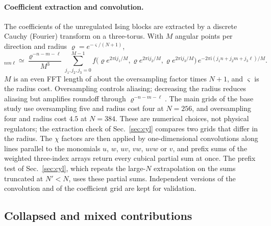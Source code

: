 \documentclass[11pt,a4paper]{article}
\numberwithin{equation}{section}
\begin{document}
\paragraph{Coefficient extraction and convolution.} The coefficients of the unregulated Ising blocks are extracted by
a discrete Cauchy (Fourier) transform on a three-torus. With $M$ angular points per direction and radius
$\varrho=e^{-\varsigma/(N+1)}$,
\begin{equation}
 [f]_{nm\ell}\simeq\frac{\varrho^{-n-m-\ell}}{M^3}\sum_{j_1,j_2,j_3=0}^{M-1}
 f\bigl(\varrho e^{2\pi\mathrm ij_1/M},\varrho e^{2\pi\mathrm ij_2/M},\varrho e^{2\pi\mathrm ij_3/M}\bigr)\,
 e^{-2\pi\mathrm i(j_1n+j_2m+j_3\ell)/M}.
\end{equation}
$M$ is an even FFT length of about the oversampling factor times $N+1$, and $\varsigma$ is the radius cost.
Oversampling controls aliasing; decreasing the radius reduces aliasing but amplifies roundoff through
$\varrho^{-n-m-\ell}$. The main grids of the base study use oversampling five and radius cost four at $N=256$, and
oversampling four and radius cost $4.5$ at $N=384$. These are numerical choices, not physical regulators; the
extraction check of Sec.~\ref{sec:cyl} compares two grids that differ in the radius. The $\chi$ factors are then
applied by one-dimensional convolutions along lines parallel to the monomials $u$, $w$, $uv$, $vw$, $uvw$ or $v$, and
prefix sums of the weighted three-index arrays return every cubical partial sum at once. The prefix test of
Sec.~\ref{sec:cyl}, which repeats the large-$N$ extrapolation on the sums truncated at $N'<N$, uses these partial sums.
Independent versions of the convolution and of the coefficient grid are kept for validation.

\subsection{Collapsed and mixed contributions}\label{app:cyl:collapsed}
\end{document}
